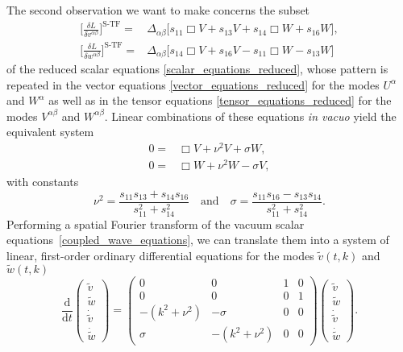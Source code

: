 The second observation we want to make concerns the subset
\begin{equation}
  \begin{aligned}
  \bigg\lbrack\frac{\delta L}{\delta v^{\alpha\beta}}\bigg\rbrack^\text{S-TF} = {} & \Delta_{\alpha\beta} \bigg\lbrack s_{11} \Box V + s_{13} V + s_{14} \Box W + s_{16} W \bigg\rbrack, \\
  \bigg\lbrack\frac{\delta L}{\delta w^{\alpha\beta}}\bigg\rbrack^\text{S-TF} = {} & \Delta_{\alpha\beta} \bigg\lbrack s_{14} \Box V + s_{16} V - s_{11} \Box W - s_{13} W \bigg\rbrack
  \end{aligned}
\end{equation}
of the reduced scalar equations \eqref{scalar_equations_reduced}, whose pattern is repeated in the vector equations \eqref{vector_equations_reduced} for the modes $U^\alpha$ and $W^\alpha$ as well as in the tensor equations \eqref{tensor_equations_reduced} for the modes $V^{\alpha\beta}$ and $W^{\alpha\beta}$. Linear combinations of these equations \emph{in vacuo} yield the equivalent system
\begin{equation}\label{coupled_wave_equations}
  \begin{aligned}
    0 = {} & \Box V + \nu^2 V + \sigma W, \\
    0 = {} & \Box W + \nu^2 W - \sigma V,
  \end{aligned}
\end{equation}
with constants
\begin{equation}
  \nu^2 = \frac{s_{11}s_{13}+s_{14}s_{16}}{s_{11}^2+s_{14}^2}\quad\text{and}\quad\sigma = \frac{s_{11}s_{16} - s_{13} s_{14}}{s_{11}^2 + s_{14}^2}.
\end{equation}
Performing a spatial Fourier transform of the vacuum scalar equations~\ref{coupled_wave_equations}, we can translate them into a system of linear, first-order ordinary differential equations for the modes $\tilde v(t,k)$ and $\tilde w(t,k)$
\begin{equation}
  \frac{\mathrm d}{\mathrm dt}\begin{pmatrix}\tilde v \\ \tilde w \\ \dot{\tilde v} \\ \dot{\tilde w}\end{pmatrix} = \begin{pmatrix}0 & 0 & 1 & 0 \\ 0 & 0 & 0 & 1 \\ -(k^2 + \nu^2) & -\sigma & 0 & 0 \\ \sigma & -(k^2 + \nu^2) & 0 & 0\end{pmatrix}\begin{pmatrix}\tilde v \\ \tilde w \\ \dot{\tilde v} \\ \dot{\tilde w}\end{pmatrix}.
\end{equation}
